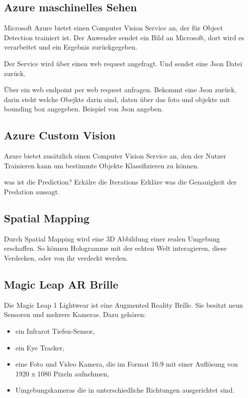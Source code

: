 \documentclass[german,a4paper, 12pt]{llncs}
\begin{document}
\subsection*{Azure maschinelles Sehen}
Microsoft Azure bietet einen Computer Vision Service an, der für Object Detection trainiert ist.
Der Anwender sendet ein Bild an Microsoft, dort wird es verarbeitet und ein Ergebnis zurückgegeben.\cite{getAzure,whatIsAzure,objDetectAzure,Azure302Doc}

Der Service wird über einen web request angefragt. Und sendet eine Json Datei zurück. 

Über ein web endpoint per web request anfragen. Bekommt eine Json zurück. darin steht welche Obejkte darin sind, daten über das foto und objekte mit bounding box angegeben. Beispiel von Json angeben. 

\subsection*{Azure Custom Vision}
Azure bietet zusätzlich einen Computer Vision Service an, den der Nutzer Trainieren kann um bestimmte Objekte Klassifizieren zu können.\cite{Azure302bDoc}

was ist die Prediction? 
Erkälre die Iterations
Erkläre was die Genauigkeit der Predation aussagt.
\subsection*{Spatial Mapping} 
Durch Spatial Mapping wird eine 3D Abbildung einer realen Umgebung erschaffen. So können Hologramme mit der echten Welt interagieren, diese Verdecken, oder von ihr verdeckt werden.\cite{spatialMapping} 

\subsection*{Magic Leap AR Brille}

Die Magic Leap 1 Lightwear ist eine Augmented Reality Brille. Sie besitzt neun Sensoren und mehrere Kameras. Dazu gehören:
\begin{itemize}
	\item ein Infrarot Tiefen-Sensor,
	\item ein Eye Tracker,
	\item eine Foto und Video Kamera, die im Format 16:9 mit einer Auflösung von 1920 x 1080 Pixeln aufnehmen,
	\item Umgebungskameras die in unterschiedliche Richtungen ausgerichtet sind. \cite{mlofficialsalespitch,mlglossary}
\end{itemize}
\end{document}
